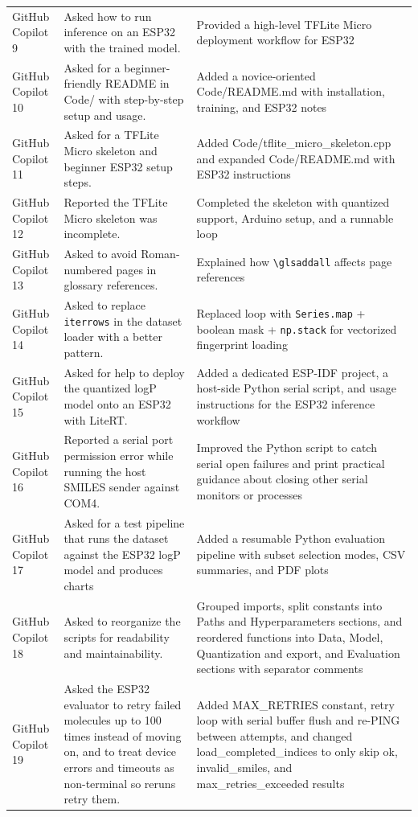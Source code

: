 {\begin{longtable}{p{} p{} p{}}
    GitHub Copilot 9 & Asked how to run inference on an ESP32 with the trained model. & Provided a high-level TFLite Micro deployment workflow for ESP32 \\
    GitHub Copilot 10 & Asked for a beginner-friendly README in Code/ with step-by-step setup and usage. & Added a novice-oriented Code/README.md with installation, training, and ESP32 notes \\
    GitHub Copilot 11 & Asked for a TFLite Micro skeleton and beginner ESP32 setup steps. & Added Code/tflite\_micro\_skeleton.cpp and expanded Code/README.md with ESP32 instructions \\
    GitHub Copilot 12 & Reported the TFLite Micro skeleton was incomplete. & Completed the skeleton with quantized support, Arduino setup, and a runnable loop \\
    GitHub Copilot 13 & Asked to avoid Roman-numbered pages in glossary references. & Explained how \texttt{\textbackslash glsaddall} affects page references \\
    GitHub Copilot 14 & Asked to replace \texttt{iterrows} in the dataset loader with a better pattern. & Replaced loop with \texttt{Series.map} + boolean mask + \texttt{np.stack} for vectorized fingerprint loading \\
    GitHub Copilot 15 & Asked for help to deploy the quantized logP model onto an ESP32 with LiteRT. & Added a dedicated ESP-IDF project, a host-side Python serial script, and usage instructions for the ESP32 inference workflow \\
    GitHub Copilot 16 & Reported a serial port permission error while running the host SMILES sender against COM4. & Improved the Python script to catch serial open failures and print practical guidance about closing other serial monitors or processes \\
    GitHub Copilot 17 & Asked for a test pipeline that runs the dataset against the ESP32 logP model and produces charts & Added a resumable Python evaluation pipeline with subset selection modes, CSV summaries, and PDF plots \\
    GitHub Copilot 18 & Asked to reorganize the scripts for readability and maintainability. & Grouped imports, split constants into Paths and Hyperparameters sections, and reordered functions into Data, Model, Quantization and export, and Evaluation sections with separator comments \\
    GitHub Copilot 19 & Asked the ESP32 evaluator to retry failed molecules up to 100 times instead of moving on, and to treat device errors and timeouts as non-terminal so reruns retry them. & Added MAX\_RETRIES constant, retry loop with serial buffer flush and re-PING between attempts, and changed load\_completed\_indices to only skip ok, invalid\_smiles, and max\_retries\_exceeded results \\

\end{longtable}}
